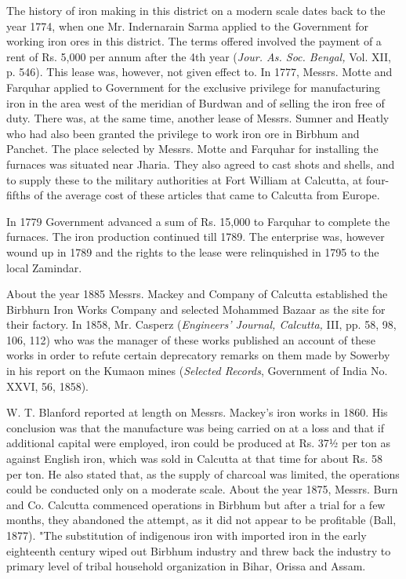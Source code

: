 The history of iron making in this district on a modern scale dates back to the year 1774, when one Mr. Indernarain Sarma applied to the Government for working iron ores in this district. The terms offered involved the payment of a rent of Rs. 5,000 per annum after the 4th year (\textit{Jour. As. Soc. Bengal,} Vol. XII, p. 546). This lease was, however, not given effect to. In 1777, Messrs. Motte and Farquhar applied to Government for the exclusive privilege for manufacturing iron in the area west of the meridian of Burdwan and of selling the iron free of duty. There was, at the same time, another lease of Messrs. Sumner and Heatly who had also been granted the privilege to work iron ore in Birbhum and Panchet. The place selected by Messrs. Motte and Farquhar for installing the furnaces was situated near Jharia. They also agreed to cast shots and shells, and to supply these to the military authorities at Fort William at Calcutta, at four-fifths of the average cost of these articles that came to Calcutta from Europe.

In 1779 Government advanced a sum of Rs. 15,000 to Farquhar to complete the furnaces. The iron production continued till 1789. The enterprise was, however wound up in 1789 and the rights to the lease were relinquished in 1795 to the local Zamindar.

About the year 1885 Messrs. Mackey and Company of Calcutta established the Birbhurn Iron Works Company and selected Mohammed Bazaar as the site for their factory. In 1858, Mr. Casperz (\textit{Engineers’ Journal, Calcutta,} III, pp. 58, 98, 106, 112) who was the manager of these works published an account of these works in order to refute certain deprecatory remarks on them made by Sowerby in his report on the Kumaon mines (\textit{Selected Records}, Government of India No. XXVI, 56, 1858).

W. T. Blanford reported at length on Messrs. Mackey’s iron works in 1860. His conclusion was that the manufacture was being carried on at a loss and that if additional capital were employed, iron could be produced at Rs. 37½ per ton as against English iron, which was sold in Calcutta at that time for about Rs. 58 per ton. He also stated that, as the supply of charcoal was limited, the operations could be conducted only on a moderate scale. About the year 1875, Messrs. Burn and Co. Calcutta commenced operations in Birbhum but after a trial for a few months, they abandoned the attempt, as it did not appear to be profitable (Ball, 1877). "The substitution of indigenous iron with imported iron in the early eighteenth century wiped out Birbhum industry and threw back the industry to primary level of tribal household organization in Bihar, Orissa and Assam.

